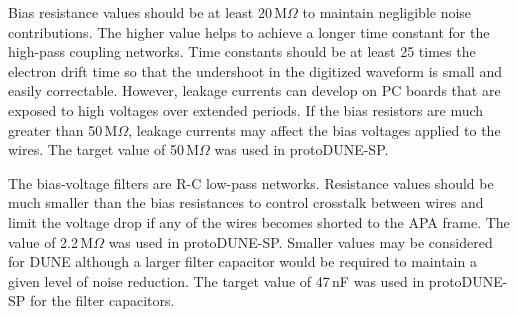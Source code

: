 
Bias resistance values should be at least 20\,M$\Omega$ to maintain negligible noise contributions.
The higher value helps to achieve a longer time constant for the high-pass coupling networks.
Time constants should be at least 25 times the electron drift time so that the undershoot in the digitized waveform
is small and easily correctable.
However, leakage currents can develop on PC boards that are exposed to high voltages over extended periods.
If the bias resistors are much greater than 50\,M$\Omega$, leakage currents may affect the bias voltages applied to the wires. The target value of 50\,M$\Omega$ was used in protoDUNE-SP.

The bias-voltage filters are R-C low-pass networks.
Resistance values should be much smaller than the bias resistances to control crosstalk between wires
and limit the voltage drop if any of the wires becomes shorted to the APA frame.
The value of 2.2\,M$\Omega$ was used in protoDUNE-SP.
Smaller values may be considered for DUNE although a larger filter capacitor would be required to maintain a given level of noise reduction.
The target value of 47\,nF was used in protoDUNE-SP for the filter capacitors.

